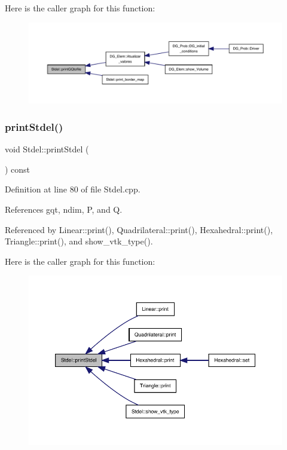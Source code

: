 Here is the caller graph for this function\+:
\nopagebreak
\begin{figure}[H]
\begin{center}
\leavevmode
\includegraphics[width=350pt]{classStdel_a8196ddf2ec3c88627e33d19f93fdb354_icgraph}
\end{center}
\end{figure}
\mbox{\label{classStdel_a54b5768d09f500cb949e66fc234eac70}} 
\subsubsection{\texorpdfstring{print\+Stdel()}{printStdel()}}
{\footnotesize\ttfamily void Stdel\+::print\+Stdel (\begin{DoxyParamCaption}{ }\end{DoxyParamCaption}) const}



Definition at line 80 of file Stdel.\+cpp.



References gqt, ndim, P, and Q.



Referenced by Linear\+::print(), Quadrilateral\+::print(), Hexahedral\+::print(), Triangle\+::print(), and show\+\_\+vtk\+\_\+type().

Here is the caller graph for this function\+:
\nopagebreak
\begin{figure}[H]
\begin{center}
\leavevmode
\includegraphics[width=350pt]{classStdel_a54b5768d09f500cb949e66fc234eac70_icgraph}
\end{center}
\end{figure}
\mbox{\label{classStdel_a315869f4c1fe1fdf4911c0d4ab092176}} 
